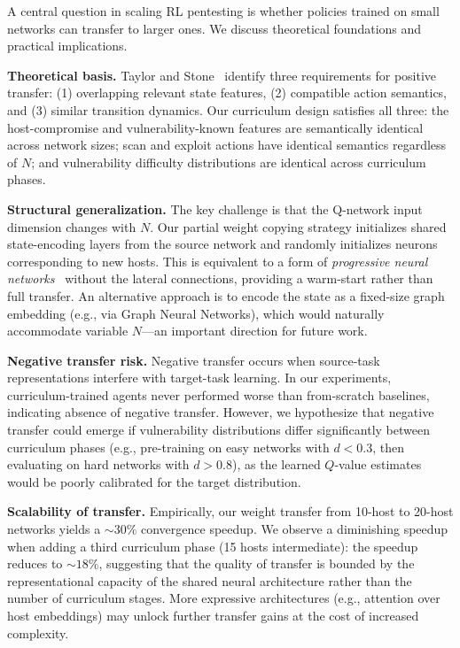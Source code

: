 \documentclass[conference]{IEEEtran}
\begin{document}
A central question in scaling RL pentesting is whether policies trained
on small networks can transfer to larger ones.  We discuss theoretical
foundations and practical implications.

\textbf{Theoretical basis.}  Taylor and Stone~\cite{taylor2009transfer}
identify three requirements for positive transfer: (1) overlapping
relevant state features, (2) compatible action semantics, and (3)
similar transition dynamics.  Our curriculum design satisfies all
three: the host-compromise and vulnerability-known features are
semantically identical across network sizes; scan and exploit actions
have identical semantics regardless of $N$; and vulnerability
difficulty distributions are identical across curriculum phases.

\textbf{Structural generalization.}
The key challenge is that the Q-network input dimension changes with
$N$.  Our partial weight copying strategy initializes shared
state-encoding layers from the source network and randomly initializes
neurons corresponding to new hosts.  This is equivalent to a form of
\emph{progressive neural networks}~\cite{rusu2016progressive} without
the lateral connections, providing a warm-start rather than full
transfer.  An alternative approach is to encode the state as a
fixed-size graph embedding (e.g., via Graph Neural Networks), which
would naturally accommodate variable $N$---an important direction for
future work.

\textbf{Negative transfer risk.}
Negative transfer occurs when source-task representations interfere
with target-task learning.  In our experiments, curriculum-trained
agents never performed worse than from-scratch baselines, indicating
absence of negative transfer.  However, we hypothesize that negative
transfer could emerge if vulnerability distributions differ
significantly between curriculum phases (e.g., pre-training on
easy networks with $d < 0.3$, then evaluating on hard networks with
$d > 0.8$), as the learned $Q$-value estimates would be poorly
calibrated for the target distribution.

\textbf{Scalability of transfer.}
Empirically, our weight transfer from 10-host to 20-host networks
yields a ${\sim}30\%$ convergence speedup.  We observe a diminishing
speedup when adding a third curriculum phase (15 hosts intermediate):
the speedup reduces to ${\sim}18\%$, suggesting that the quality of
transfer is bounded by the representational capacity of the shared
neural architecture rather than the number of curriculum stages.
More expressive architectures (e.g., attention over host embeddings)
may unlock further transfer gains at the cost of increased complexity.
\end{document}
